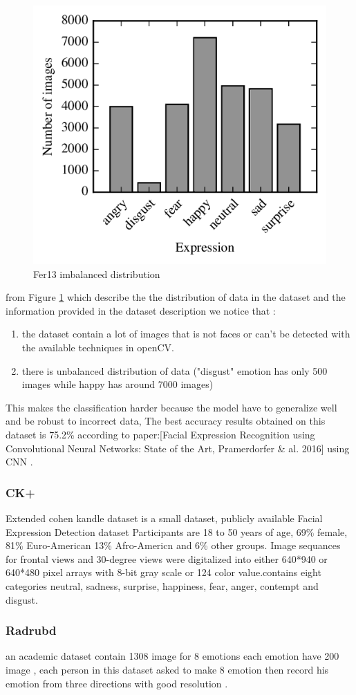 \begin{figure}
	\centering
	\includegraphics[width=.5\textwidth]{images/fer_dis.png}
	\caption{Fer13 imbalanced distribution}
	\label{fig:fer13}
\end{figure}
from Figure \ref{fig:fer13} which describe the the distribution of data in the dataset and the information provided in the dataset description we notice that :
\begin{enumerate}
	\item the dataset contain a lot of images that is not faces or can't be detected with the available techniques in openCV.
	\item there is unbalanced distribution of data ("disgust" emotion has only 500 images while happy has around 7000 images)   
\end{enumerate}

 This makes the classification harder because the model have to generalize well and be robust to incorrect data, The best accuracy results obtained on this dataset is 75.2\% according to paper:\cite{state_of_art}[Facial Expression Recognition using Convolutional Neural Networks: State of the Art, Pramerdorfer \& al. 2016] using CNN .

\subsubsection{CK+}
Extended cohen kandle dataset is a small dataset, publicly available Facial Expression Detection dataset Participants are 18 to 50 years of age, 69\% female, 81\% Euro-American 13\% Afro-Americn and 6\% other groups.
\newline
Image sequances for frontal views and 30-degree views were digitalized into either 640*940 or 640*480 pixel arrays with 8-bit gray scale or 124 color value.contains eight categories neutral, sadness, surprise, happiness, fear, anger, contempt and disgust.

\subsubsection{Radrubd}
an academic dataset contain 1308 image for 8 emotions each emotion have 200 image , each person in this dataset asked to make 8 emotion then record his emotion from three directions with good resolution .
